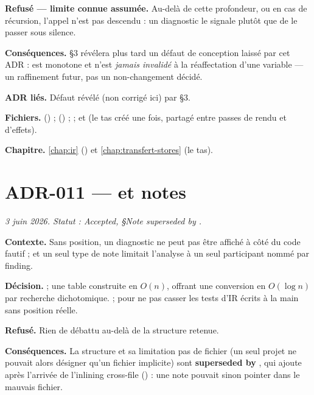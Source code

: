 
\textbf{Refusé --- limite connue assumée.} Au-delà de cette profondeur, ou en
cas de récursion, l'appel n'est pas descendu : un diagnostic \Info{}
 le signale plutôt que de le passer sous silence.

\textbf{Conséquences.}  §3 révélera plus tard un défaut de conception
laissé par cet ADR :  est monotone et n'est \emph{jamais invalidé}
à la réaffectation d'une variable --- un raffinement futur, pas un
non-changement décidé.

\textbf{ADR liés.} Défaut révélé (non corrigé ici) par  §3.

\begin{sloppypar}
\textbf{Fichiers.}  () ;
 () ;
 ;
 et  (le tas
créé une fois, partagé entre passes de rendu et d'effets).
\end{sloppypar}

\textbf{Chapitre.} \cref{chap:ir} () et \cref{chap:transfert-stores}
(le tas).

\section{ADR-011 ---  et notes}
\label{adr:11}
\noindent\textit{3 juin 2026. Statut : Accepted, §Note superseded by .}

\textbf{Contexte.} Sans position, un diagnostic ne peut pas être affiché à
côté du code fautif ; et un seul type de note limitait l'analyse à un seul
participant nommé par finding.

\textbf{Décision.}  ; une table
 construite en $O(n)$, offrant une conversion en
$O(\log n)$ par recherche dichotomique.  ;  pour ne pas casser les tests d'IR
écrits à la main sans position réelle.

\textbf{Refusé.} Rien de débattu au-delà de la structure retenue.

\textbf{Conséquences.} La structure  et sa limitation \og pas de
fichier\fg{} (un seul projet ne pouvait alors désigner qu'un fichier
implicite) sont \textbf{superseded by }, qui ajoute 
après l'arrivée de l'inlining cross-file () : une note pouvait sinon
pointer dans le mauvais fichier.


